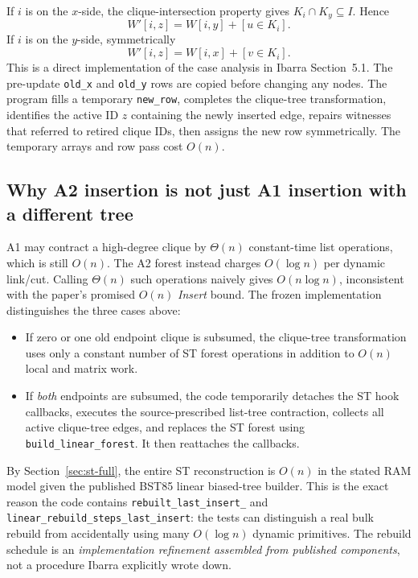 If \(i\) is on the \(x\)-side, the clique-intersection property gives \(K_i\cap K_y\subseteq I\).  Hence
\[
W'[i,z]=W[i,y]+[u\in K_i].
\]
If \(i\) is on the \(y\)-side, symmetrically
\[
W'[i,z]=W[i,x]+[v\in K_i].
\]
This is a direct implementation of the case analysis in Ibarra Section~5.1.  The pre-update \texttt{old\_x} and \texttt{old\_y} rows are copied before changing any nodes.  The program fills a temporary \texttt{new\_row}, completes the clique-tree transformation, identifies the active ID \(z\) containing the newly inserted edge, repairs witnesses that referred to retired clique IDs, then assigns the new row symmetrically.  The temporary arrays and row pass cost \(O(n)\).

\subsection{Why A2 insertion is not just A1 insertion with a different tree}
A1 may contract a high-degree clique by \(\Theta(n)\) constant-time list operations, which is still \(O(n)\).  The A2 forest instead charges \(O(\log n)\) per dynamic link/cut.  Calling \(\Theta(n)\) such operations naively gives \(O(n\log n)\), inconsistent with the paper's promised \(O(n)\) \emph{Insert} bound.  The frozen implementation distinguishes the three cases above:
\begin{itemize}
\item If zero or one old endpoint clique is subsumed, the clique-tree transformation uses only a constant number of ST forest operations in addition to \(O(n)\) local and matrix work.
\item If \emph{both} endpoints are subsumed, the code temporarily detaches the ST hook callbacks, executes the source-prescribed list-tree contraction, collects all active clique-tree edges, and replaces the ST forest using \texttt{build\_linear\_forest}.  It then reattaches the callbacks.
\end{itemize}
By Section~\ref{sec:st-full}, the entire ST reconstruction is \(O(n)\) in the stated RAM model given the published BST85 linear biased-tree builder.  This is the exact reason the code contains \texttt{rebuilt\_last\_insert\_} and \texttt{linear\_rebuild\_steps\_last\_insert}: the tests can distinguish a real bulk rebuild from accidentally using many \(O(\log n)\) dynamic primitives.  The rebuild schedule is an \emph{implementation refinement assembled from published components}, not a procedure Ibarra explicitly wrote down.

